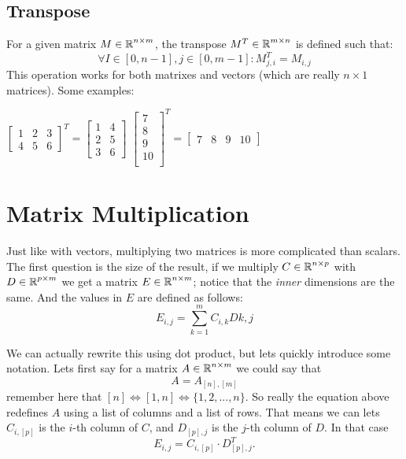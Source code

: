 \subsection{Transpose} 
For a given matrix $M \in \operatorname{\mathbb{R}}^{n\times m}$, the transpose $M^T \in \operatorname{\mathbb{R}}^{m \times n}$ is defined such that:
\[
\forall I\in[0,n-1], j\in[0,m-1] : M^T_{j,i} = M_{i,j} 
\]
This operation works for both matrixes and vectors (which are really $n\times1$ matrices).
Some examples: 
\begin{center}
$\left[\begin{matrix}
1 & 2 & 3\\
4 & 5 & 6
\end{matrix}\right]^T = 
\left[\begin{matrix}
1 & 4 \\
2 & 5 \\
3 & 6
\end{matrix}\right]$%
\hspace{5em}
$\left[\begin{matrix}
7 \\
8 \\
9 \\
10 \\
\end{matrix}\right]^T = \left[\begin{matrix}
7 & 8 & 9 & 10
\end{matrix}\right]
$
\end{center}
\section{Matrix Multiplication}
Just like with vectors, multiplying two matrices is more complicated than scalars. 
The first question is the size of the result, if we multiply $C \in \operatorname{\mathbb{R}}^{n\times p}$ with $D \in \operatorname{\mathbb{R}}^{p\times m}$ we get a matrix $E \in \operatorname{\mathbb{R}}^{n\times m}$;
notice that the \textit{inner} dimensions are the same.
And the values in $E$ are defined as follows:
\[
E_{i,j} = \sum_{k=1}^m C_{i,k}D{k,j}
\]

We can actually rewrite this using dot product, but lets quickly introduce some notation.
Lets first say for a matrix $A\in\operatorname{\mathbb{R}}^{n\times m}$ we could say that 
\[A = A_{[n],[m]}\] 
remember here that $[n] \iff [1,n] \iff \{1,2,...,n\}$. 
So really the equation above redefines $A$ using a list of columns and a list of rows. 
That means we can lets $C_{i,[p]}$ is the $i$-th column of $C$, and $D_{[p],j}$ is the $j$-th column of $D$.
In that case \[E_{i,j} = C_{i,[p]}\cdot D_{[p],j}^T.\]

